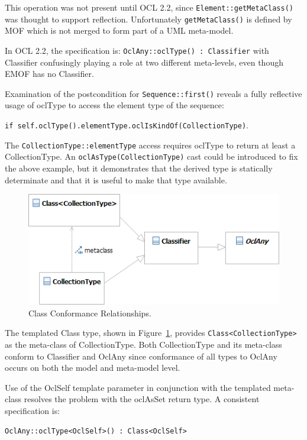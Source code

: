 \documentclass{eceasst}
\begin{document}
This operation was not present until OCL 2.2, since \verb!Element::getMetaClass()! was  thought to support reflection. Unfortunately \verb!getMetaClass()! is defined by MOF which is not merged to form part of a UML meta-model.

In OCL 2.2, the specification is: \verb!OclAny::oclType() : Classifier! with Classifier confusingly playing a role at two different meta-levels, even though EMOF has no Classifier.

Examination of the postcondition for \verb|Sequence::first()| reveals a fully reflective usage of oclType to access the element type of the sequence:

\verb|if self.oclType().elementType.oclIsKindOf(CollectionType)|. 

The \verb|CollectionType::elementType| access requires oclType to return at least a CollectionType. An \verb|oclAsType(CollectionType)| cast could be introduced to fix the above example, but it demonstrates that the
derived type is statically determinate and that it is useful to make that type available.

\begin{figure}
  \begin{center}
    \includegraphics[width=4.5in]{Class.png}
  \end{center}
  \caption{Class Conformance Relationships.}
  \label{fig:Class}
\end{figure}

The templated Class type, shown in Figure~\ref{fig:Class}, provides \verb|Class<CollectionType>| as the meta-class of CollectionType. Both CollectionType and its meta-class conform to Classifier and OclAny since conformance of all types to OclAny occurs on  both the model and meta-model level. 

Use of the OclSelf template parameter in conjunction with the templated meta-class resolves the problem with the oclAsSet return type. A consistent specification is:

\verb!OclAny::oclType<OclSelf>() : Class<OclSelf>!
\end{document}
